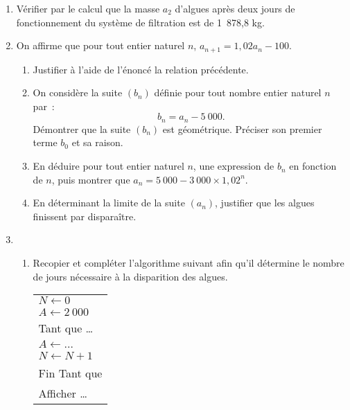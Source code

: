 \begin{enumerate}
     \item Vérifier par le calcul que la masse $a_2$ d'algues après deux jours de
     fonctionnement du système de filtration est de 1~878,8 kg.
     \item On affirme que pour tout entier naturel $n$,\: $a_{n+1} = 1,02a_n - 100$.
     \begin{enumerate}[label=\alph*.]
          \item Justifier à l'aide de l'énoncé la relation précédente.
          \item  On considère la suite $\left(b_n\right)$ définie pour tout nombre entier naturel $n$ par~:
          \[b_n = a_n - 5~000.\]
          Démontrer que la suite $\left(b_n\right)$ est géométrique. Préciser son premier terme
          $b_0$ et sa raison.
          \item  En déduire pour tout entier naturel $n$, une expression de $b_n$ en fonction de
          $n$, puis montrer que $a_n = 5~000 - 3~000 \times 1,02^n$.
          \item  En déterminant la limite de la suite $\left(a_n\right)$, justifier que les algues finissent
          par disparaître.
     \end{enumerate}
     \item
     \begin{enumerate}[label=\alph*.]
          \item Recopier et compléter l'algorithme suivant afin qu'il détermine le nombre
          de jours nécessaire à la disparition des algues.
          \begin{center}
               \begin{extern}%
                    \begin{tabularx}{0.25\linewidth}{|X|}\hline
                         $N \gets 0$\\
                         $A \gets 2~000$\\
                         Tant que \ldots\\
                         \hspace{1cm}$A \gets \ldots$\\
                         \hspace{1cm}$N \gets N + 1$\\
                         Fin Tant que\\
                         Afficher \ldots\\ \hline

\end{tabularx}
\end{extern}
\end{center}
\end{enumerate}
\end{enumerate}
